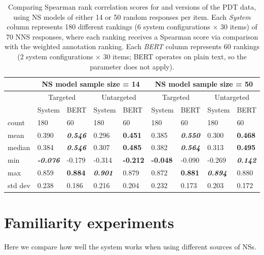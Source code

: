 \begin{table}[htb!]
\begin{center}
\begin{tabular}{|l||l|l||l|l||l|l||l|l|}
\hline
& \multicolumn{4}{c||}{NS model sample size = 14} & \multicolumn{4}{c|}{NS model sample size = 50} \\
\hline
 & \multicolumn{2}{c||}{Targeted} & \multicolumn{2}{c||}{Untargeted} & \multicolumn{2}{c||}{Targeted} & \multicolumn{2}{c|}{Untargeted} \\
\hline
	& System 		& BERT 		& System 	& BERT 		& System 	& BERT 		& System 	& BERT \\
\hline
count 	& 180 		& 60 		& 180 		& 60 		& 180 		& 60 		& 180 		& 60 \\
\hline
mean 	& 0.390 	& \textit{\textbf{0.546}} 	& 0.296 	& \textbf{0.451} 	& 0.385 	& \textit{\textbf{0.550}} 	& 0.300 	& \textbf{0.468}  \\
\hline
median 	& 0.384 	& \textit{\textbf{0.546}} 	& 0.307 	& \textbf{0.485} 	& 0.382 	& \textit{\textbf{0.564}} 	& 0.313		& \textbf{0.495} \\
\hline
min 	& \textit{\textbf{-0.076}} 	& -0.179 	& -0.314 	& \textbf{-0.212} 	& \textbf{-0.048} 	& -0.090	& -0.269 	& \textit{\textbf{0.142}} \\
\hline
max 	& 0.859 	& \textbf{0.884} 	& \textit{\textbf{0.901}}		& 0.879 	& 0.872 	& \textbf{0.881}		& \textit{\textbf{0.894}} 	& 0.880 \\
\hline
std dev 	& 0.238 	& 0.186 	& 0.216 	& 0.204 	& 0.232 	& 0.173		& 0.203 	& 0.172 \\
\hline
\end{tabular}
\caption{\label{tab:targeting-results} Comparing Spearman rank correlation scores for  and  versions of the PDT data, using NS models of either 14 or 50 random responses per item. Each \textit{System} column represents 180 different rankings (6 system configurations $\times$ 30 items) of 70 NNS responses, where each ranking receives a Spearman score via comparison with the weighted annotation ranking. Each \textit{BERT} column represents 60 rankings (2 system configurations $\times$ 30 items; BERT operates on plain text, so the  parameter does not apply).
}
\end{center}
\end{table}


\section{Familiarity experiments}
\label{sec:exp-familiarity}
Here we compare how well the system works when using different sources of NSs. 
